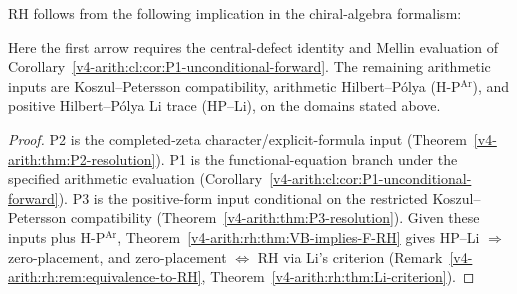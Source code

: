 \begin{theorem}
\label{v4-arith:rh:thm:sufficient-path}
RH follows from the following implication in
the chiral-algebra formalism:
\begin{center}
\end{center}
Here the first arrow requires the central-defect identity and
Mellin evaluation of
Corollary~\ref{v4-arith:cl:cor:P1-unconditional-forward}.
The remaining arithmetic inputs are Koszul--Petersson compatibility,
arithmetic Hilbert--P\'olya (H-P\(^{\mathrm{Ar}}\)), and positive
Hilbert--P\'olya Li trace (HP--Li), on the domains stated above.
\end{theorem}

\begin{proof}
P2 is the completed-zeta character/explicit-formula input
(Theorem~\ref{v4-arith:thm:P2-resolution}). P1 is the functional-equation
branch under the specified arithmetic evaluation
(Corollary~\ref{v4-arith:cl:cor:P1-unconditional-forward}). P3 is the positive-form input
conditional on the restricted Koszul--Petersson compatibility
(Theorem~\ref{v4-arith:thm:P3-resolution}). Given these inputs plus
H-P\(^{\mathrm{Ar}}\),
Theorem~\ref{v4-arith:rh:thm:VB-implies-F-RH} gives
HP--Li \(\Rightarrow\) zero-placement, and zero-placement
\(\Leftrightarrow\) RH via Li's
criterion (Remark~\ref{v4-arith:rh:rem:equivalence-to-RH},
Theorem~\ref{v4-arith:rh:thm:Li-criterion}).
\end{proof}

